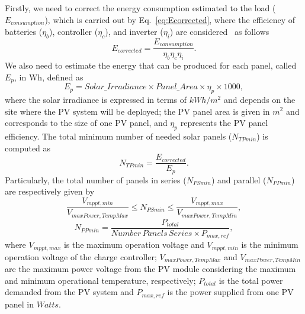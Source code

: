 \documentclass[10pt,conference]{IEEEtran}
\begin{document}
%
Firstly, we need to correct the energy consumption estimated to the load ($E_{consumption}$), which is carried out by Eq.~\eqref{eq:Ecorrected}, where the efficiency of batteries ($\eta_{b}$), controller ($\eta_{c}$), and inverter ($\eta_{i}$) are considered~\cite{Pinho} as follows
\begin{equation}
\label{eq:Ecorrected}
\scriptstyle E_{corrected} = \dfrac{\scriptstyle E_{consumption}}{ \scriptstyle \eta_{b} \eta_{c} \eta_{i} }.
\end{equation}
%
We also need to estimate the energy that can be produced for each panel, called $E_{p}$, in Wh, defined as
%
\begin{equation}
\label{eq:Ep}
\scriptstyle E_{p} = \scriptstyle Solar\_Irradiance \times Panel\_Area \times \eta_{p} \times 1000,
\end{equation}
%
\noindent where the solar irradiance is expressed in terms of $kWh/m^{2}$ and depends on the site where the PV system will be deployed; 
the PV panel area is given in $m^{2}$ and corresponds to the size of one PV panel, and $\eta_{p}$ represents the PV panel efficiency.
%
The total minimum number of needed solar panels ($N_{TPmin}$) is computed as
%
\begin{equation}
\label{eq:NTPmin}
\scriptstyle N_{TPmin} = \dfrac{\scriptstyle E_{corrected}}{\scriptstyle E_{p}}.
\end{equation}
%
Particularly, the total number of panels in series ($N_{PSmin}$) and parallel ($N_{PPmin}$) are respectively given by
%
\begin{equation}
\label{eq:NPSmin}
\dfrac{\scriptstyle V_{mppt,min}}{\scriptstyle V_{maxPower,TempMax}} \scriptstyle \leq \scriptstyle N_{PSmin} \leq \dfrac{\scriptstyle V_{mppt,max}}{\scriptstyle V_{maxPower,TempMin}},
\end{equation}
%
\begin{equation}
\label{eq:NPPmin}
\scriptstyle N_{PPmin} = \dfrac{\scriptstyle P_{total}}{\scriptstyle Number\,Panels\,Series \scriptstyle \times \scriptstyle P_{max,ref}},
\end{equation}
%
\noindent where $V_{mppt,max}$ is the maximum operation voltage and $V_{mppt,min}$ is the minimum operation voltage of the charge controller; $V_{maxPower,TempMax}$ and $V_{maxPower,TempMin}$ are the maximum power voltage from the PV module considering the maximum and minimum operational temperature, respectively; $P_{total}$ is the total power demanded from the PV system and $P_{max,ref}$ is the power supplied from one PV panel in $Watts$.
\end{document}
